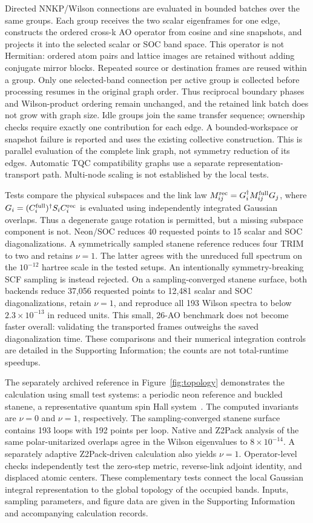 Directed NNKP/Wilson connections are evaluated in bounded batches
over the same groups. Each group receives the two scalar eigenframes
for one edge, constructs the ordered cross-k AO operator from cosine
and sine snapshots, and projects it into the selected scalar or SOC
band space. This operator is not Hermitian: ordered atom pairs and
lattice images are retained without adding conjugate mirror blocks.
Repeated source or destination frames are reused within a group.
Only one selected-band connection per active group is collected before
processing resumes in the original graph order. Thus reciprocal
boundary phases and Wilson-product ordering remain unchanged, and
the retained link batch does not grow with graph size. Idle groups
join the same transfer sequence; ownership checks require exactly
one contribution for each edge. A bounded-workspace or snapshot
failure is reported and uses the existing collective construction.
This is parallel evaluation of the complete link graph, not symmetry
reduction of its edges. Automatic TQC compatibility graphs use a
separate representation-transport path. Multi-node scaling is not
established by the local tests.

Tests compare the physical subspaces and the link law
$M^{\rm rec}_{ij}=G_i^\dagger M^{\rm full}_{ij}G_j$, where
$G_i=(C_i^{\rm full})^\dagger S_iC_i^{\rm rec}$ is evaluated using
independently integrated Gaussian overlaps. Thus a degenerate gauge
rotation is permitted, but a missing subspace component is not.
Neon/SOC reduces 40 requested points to 15 scalar and SOC
diagonalizations. A symmetrically sampled stanene reference reduces four
TRIM to two and retains $\nu=1$. The latter agrees with the unreduced
full spectrum on the $10^{-12}$ hartree scale in the tested setups.
An intentionally symmetry-breaking SCF sampling is instead rejected.
On a sampling-converged stanene surface, both backends reduce 37,056
requested points to 12,481 scalar and SOC diagonalizations, retain
$\nu=1$, and reproduce all 193 Wilson spectra to below
$2.3\times10^{-13}$ in reduced units. This small, 26-AO benchmark does
not become faster overall: validating the transported frames outweighs
the saved diagonalization time.
These comparisons and their numerical integration controls are detailed
in the Supporting Information; the counts are not total-runtime speedups.

The separately archived reference in Figure~\ref{fig:topology} demonstrates the calculation using small test
systems: a periodic neon reference and buckled stanene, a representative quantum spin Hall
system~\cite{Xu2013}. The computed invariants are $\nu=0$ and $\nu=1$,
respectively. The sampling-converged stanene surface contains 193 loops with 192
points per loop. Native and Z2Pack analysis of the same polar-unitarized
overlaps agree in the Wilson eigenvalues to $8\times10^{-14}$. A separately
adaptive Z2Pack-driven calculation also yields $\nu=1$. Operator-level
checks independently test the zero-step metric, reverse-link adjoint
identity, and displaced atomic centers. These complementary tests connect
the local Gaussian integral representation to the global topology of the
occupied bands. Inputs, sampling parameters, and figure data are given in
the Supporting Information and accompanying calculation records.

